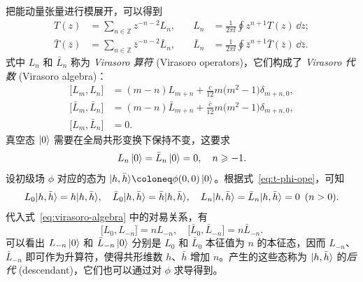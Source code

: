 把能动量张量进行模展开，可以得到
\begin{equation}
  \begin{aligned}
    T(z)             &= \sum_{n\in\mathbb{Z}} z^{-n-2} L_n, &\quad
    L_n              &= \frac{1}{2\pi\ii} \oint z^{n+1} T(z) \, \dd z; \\
    \bar{T}(\bar{z}) &= \sum_{n\in\mathbb{Z}} \bar{z}^{-n-2} \bar{L}_n, &\quad
    \bar{L}_n        &= \frac{1}{2\pi\ii} \oint \bar{z}^{n+1} \bar{T}(\bar{z}) \, \dd\bar{z}.
  \end{aligned}
  \label{eq:virasoro-operators}
\end{equation}
式中 $L_n$ 和 $\bar{L}_n$ 称为 \emph{Virasoro 算符} (Virasoro operators)，它们构成了 \emph{Virasoro 代数} (Virasoro algebra)：
\begin{equation}
  \begin{aligned}
    \bigl[ L_m, L_n \bigr]
      &= (m-n) L_{m+n} + \frac{c}{12} m \bigl( m^2-1 \bigr) \delta_{m+n,0}, \\
    \bigl[ \bar{L}_m, \bar{L}_n \bigr]
      &= (m-n) \bar{L}_{m+n} + \frac{\bar{c}}{12} m \bigl( m^2-1 \bigr) \delta_{m+n,0}, \\
    \bigl[ L_m, \bar{L}_n \bigr] &= 0.
  \end{aligned}
  \label{eq:virasoro-algebra}
\end{equation}
真空态 $\ket{0}$ 需要在全局共形变换下保持不变，这要求
\begin{equation}
  L_n \ket{0} = \bar{L}_n \ket{0} = 0, \quad n \geqslant -1.
\end{equation}
设初级场 $\phi$ 对应的态为 $\ket*{h,\bar{h}}\coloneq\phi(0,0)\ket{0}$。根据式~\eqref{eq:t-phi-ope}，可知
\begin{equation}
  L_0       \ket*{h,\bar{h}} = h       \ket*{h,\bar{h}}, \quad
  \bar{L}_0 \ket*{h,\bar{h}} = \bar{h} \ket*{h,\bar{h}}, \quad
  L_n \ket*{h,\bar{h}} = \bar{L}_n \ket*{h,\bar{h}} = 0 \enspace (n > 0).
\end{equation}
代入式~\eqref{eq:virasoro-algebra} 中的对易关系，有
\begin{equation}
  \bigl[ L_0, L_{-n} \bigr] = n L_{-n}, \quad
  \bigl[ \bar{L}_0, \bar{L}_{-n} \bigr] = n \bar{L}_{-n}.
\end{equation}
可以看出 $L_{-n}\ket{0}$ 和 $\bar{L}_{-n}\ket{0}$ 分别是 $L_0$ 和 $\bar{L}_0$ 本征值为 $n$ 的本征态，因而 $L_{-n}$、$\bar{L}_{-n}$ 即可作为升算符，使得共形维数 $h$、$\bar{h}$ 增加 $n$。产生的这些态称为 $\ket*{h,\bar{h}}$ 的\emph{后代} (descendant)，它们也可以通过对 $\phi$ 求导得到。

